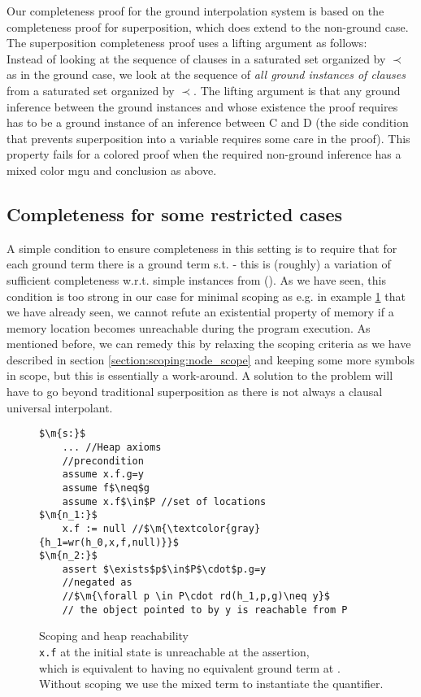 Our completeness proof for the ground interpolation system is based on the completeness proof for superposition, which does extend to the non-ground case.
The superposition completeness proof uses a lifting argument as follows:\\
Instead of looking at the sequence of clauses in a saturated set organized by $\prec$ as in the ground case, we look at the sequence of \emph{all ground instances of clauses} from a saturated set organized by $\prec$. The lifting argument is that any ground inference between the ground instances  and  whose existence the proof requires has to be a ground instance of an inference between C and D (the side condition that prevents superposition into a variable requires some care in the proof).
This property fails for a colored proof when the required non-ground inference has a mixed color mgu and conclusion as above.

\subsection{Completeness for some restricted cases}
A simple condition to ensure completeness in this setting is to require that for each ground term  there is a ground term  s.t.  - this is (roughly) a variation of sufficient completeness w.r.t. simple instances from (\cite{BaumgartnerWaldmann13}). As we have seen, this condition is too strong in our case for minimal scoping as e.g. in example \ref{snippet4.2.4.1b} that we have already seen, we cannot refute an existential property of memory if a memory location becomes unreachable during the program execution.
As mentioned before, we can remedy this by relaxing the scoping criteria as we have described in section \ref{section:scoping:node_scope} and keeping some more symbols in scope, but this is essentially a work-around.
A solution to the problem will have to go beyond traditional superposition as there is not always a clausal universal interpolant.

\begin{figure}
\begin{lstlisting}
$\m{s:}$
	... //Heap axioms
	//precondition
	assume x.f.g=y
	assume f$\neq$g
	assume x.f$\in$P //set of locations
$\m{n_1:}$
	x.f := null //$\m{\textcolor{gray}{h_1=wr(h_0,x,f,null)}}$
$\m{n_2:}$
	assert $\exists$p$\in$P$\cdot$p.g=y
	//negated as
	//$\m{\forall p \in P\cdot rd(h_1,p,g)\neq y}$ 
	// the object pointed to by y is reachable from P
\end{lstlisting}
\caption{Scoping and heap reachability\\
\lstinline|x.f| at the initial state is unreachable at the assertion,\\
which is equivalent to  having no equivalent ground term at .\\
Without scoping we use the mixed term  to instantiate the quantifier.
}
\label{snippet4.2.4.1b}
\end{figure}


